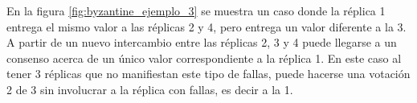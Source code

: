 

En la figura \ref{fig:byzantine_ejemplo_3} se muestra un caso donde la réplica 1 entrega el mismo valor a las réplicas 2 y 4, pero entrega un valor diferente a la 3. A partir de un nuevo intercambio entre las réplicas 2, 3 y 4 puede llegarse a un consenso acerca de un único valor correspondiente a la réplica 1. En este caso al tener 3 réplicas que no manifiestan este tipo de fallas, puede hacerse una votación 2 de 3 sin involucrar a la réplica con fallas, es decir a la 1.


